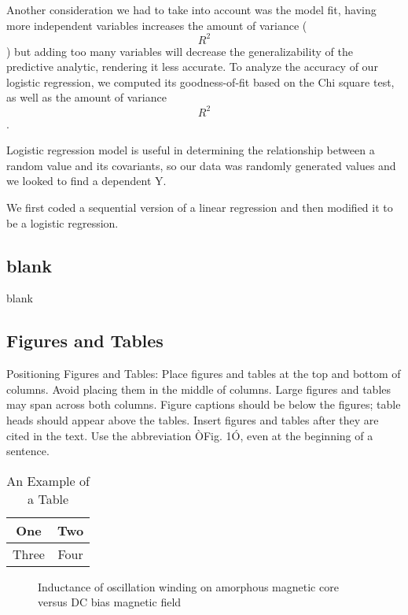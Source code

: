 \documentclass[letterpaper, 10 pt, conference]{ieeeconf}  %
\begin{document}
Another consideration we had to take into account was the model fit, having more independent variables increases the amount of variance ($$R^2$$) but adding too many variables will decrease the generalizability of the predictive analytic, rendering it less accurate. To analyze the accuracy of our logistic regression, we computed its goodness-of-fit based on the Chi square test, as well as the amount of variance $$R^2$$.  

Logistic regression model is useful in determining the relationship between a random value and its covariants, so our data was randomly generated values and we looked to find a dependent Y.

We first coded a sequential version of a linear regression and then modified it to be a logistic regression. 


\subsection{blank}

blank

\subsection{Figures and Tables}

Positioning Figures and Tables: Place figures and tables at the top and bottom of columns. Avoid placing them in the middle of columns. Large figures and tables may span across both columns. Figure captions should be below the figures; table heads should appear above the tables. Insert figures and tables after they are cited in the text. Use the abbreviation ÒFig. 1Ó, even at the beginning of a sentence.

\begin{table}[h]
\caption{An Example of a Table}
\label{table_example}
\begin{center}
\begin{tabular}{|c||c|}
\hline
One & Two\\
\hline
Three & Four\\
\hline
\end{tabular}
\end{center}
\end{table}


   \begin{figure}[thpb]
      \centering
      \caption{Inductance of oscillation winding on amorphous
       magnetic core versus DC bias magnetic field}
      \label{figurelabel}
   \end{figure}
   
\end{document}
